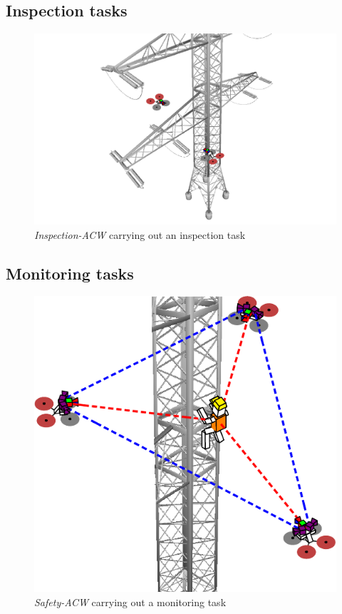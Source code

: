 \subsection{Inspection tasks}
\label{subsec:InspectionTasks}
\begin{figure}[htbp]
    \centering
    \includegraphics[width=1\linewidth]
    {ProblemFormulation/figures/inspection_task.pdf}
    \caption{\textit{Inspection-ACW} carrying out an inspection task}
    \label{fig:inspection_task}
\end{figure}

\subsection{Monitoring tasks}
\label{subsec:MonitoringTasks}
\begin{figure}[htbp]
    \centering
    \includegraphics[width=1\linewidth]
    {ProblemFormulation/figures/monitor_task.pdf}
    \caption{\textit{Safety-ACW} carrying out a monitoring task}
    \label{fig:monitor_task}
\end{figure}

